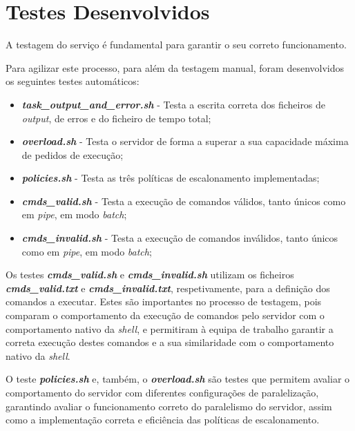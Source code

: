 \documentclass[a4paper,11pt]{scrreprt}
\begin{document}
\begin{minipage}{\textwidth}
\chapter{Testes Desenvolvidos}
    A testagem do serviço é fundamental para garantir o seu correto funcionamento.

    \vspace{1em}

    Para agilizar este processo, para além da testagem manual,
    foram desenvolvidos os seguintes testes automáticos:

    \begin{itemize}
        \item \textbf{\textit{task\_output\_and\_error.sh}} - Testa a escrita correta dos ficheiros
            de \textit{output}, de erros e do ficheiro de tempo total;
        \item \textbf{\textit{overload.sh}} - Testa o servidor de forma a superar a sua capacidade máxima
            de pedidos de execução;
        \item \textbf{\textit{policies.sh}} - Testa as três políticas de escalonamento implementadas;
        \item \textbf{\textit{cmds\_valid.sh}} - Testa a execução de comandos válidos, tanto únicos como
            em \textit{pipe}, em modo \textit{batch};
        \item \textbf{\textit{cmds\_invalid.sh}} - Testa a execução de comandos inválidos, tanto únicos
            como em \textit{pipe}, em modo \textit{batch};
    \end{itemize}

    \vspace{1em}

    Os testes \textbf{\textit{cmds\_valid.sh}} e \textbf{\textit{cmds\_invalid.sh}} utilizam os ficheiros
    \textbf{\textit{cmds\_valid.txt}} e \textbf{\textit{cmds\_invalid.txt}}, respetivamente, para a definição
    dos comandos a executar. Estes são importantes no processo de testagem,
    pois comparam o comportamento da execução de comandos pelo servidor
    com o comportamento nativo da \textit{shell}, e permitiram à equipa de trabalho
    garantir a correta execução destes comandos e a sua similaridade com o comportamento
    nativo da \textit{shell}.

    \vspace{1em}

    O teste \textbf{\textit{policies.sh}} e, também, o \textbf{\textit{overload.sh}} são testes que permitem
    avaliar o comportamento do servidor com diferentes configurações de paralelização,
    garantindo avaliar o funcionamento correto do paralelismo do servidor, assim como a implementação
    correta e eficiência das políticas de escalonamento.


\end{minipage}
\end{document}
